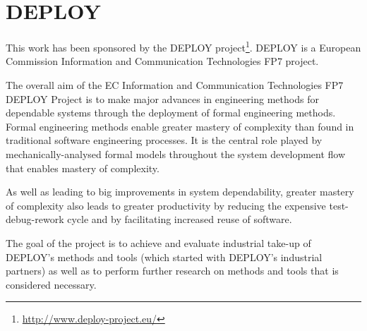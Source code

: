 \documentclass[twoside,10pt]{book}
\begin{document}
\section{DEPLOY}
\label{deploy}

This work has been sponsored by the DEPLOY project\footnote{\url{http://www.deploy-project.eu/}}.  DEPLOY is a European Commission Information and Communication Technologies FP7 project.

The overall aim of the EC Information and Communication Technologies FP7 DEPLOY Project is to make major advances in engineering methods for dependable systems through the deployment of formal engineering methods. Formal engineering methods enable greater mastery of complexity than found in traditional software engineering processes. It is the central role played by mechanically-analysed formal models throughout the system development flow that enables mastery of complexity.

As well as leading to big improvements in system dependability, greater mastery of complexity also leads to greater productivity by reducing the expensive test-debug-rework cycle and by facilitating increased reuse of software.

The goal of the project is to achieve and evaluate industrial take-up of DEPLOY's methods and tools (which started with DEPLOY's industrial partners) as well as to perform further research on methods and tools that is considered necessary.



% 







\clearpage
{}
{} 
\printindex
\end{document}
